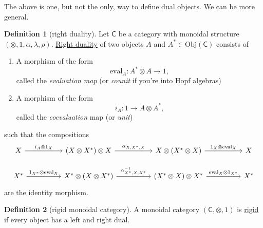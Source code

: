 \documentclass[a4paper]{report}
\newcommand{\defn}[1]{\ul{#1}}
\newcommand{\Obj}{\mathrm{Obj}}
\newcommand{\ev}{\mathrm{eval}}
\theoremstyle{definition}
\newtheorem{definition}{Definition}[section]
\theoremstyle{plain}
\theoremstyle{remark}
\begin{document}
The above is one, but not the only, way to define dual objects. We can be more general.
\begin{definition}[right duality]
  \label{def:rightduality}
  Let $\mathsf{C}$ be a category with monoidal structure $(\otimes, 1, \alpha, \lambda, \rho)$. \defn{Right duality} of two objects $A$ and $A^{*} \in \Obj(\mathsf{C})$ consists of
  \begin{enumerate}
    \item A morphism of the form
      \begin{equation*}
        \ev_{A}\colon A^{*} \otimes A \to 1,
      \end{equation*}
      called the \emph{evaluation map} (or \emph{counit} if you're into Hopf algebras)

    \item A morphism of the form
      \begin{equation*}
        i_{A}\colon 1 \to A \otimes A^{*},
      \end{equation*}
      called the \emph{coevaluation} map (or \emph{unit})
  \end{enumerate}
  such that the compositions
  \begin{equation*}
    \begin{tikzcd}[column sep=huge]
      X 
      \arrow[r, "i_{A} \otimes 1_{X}"]
      & (X \otimes X^{*}) \otimes X
      \arrow[r, "{\alpha_{X, X^{*}, X}}"]
      & X \otimes (X^{*} \otimes X) 
      \arrow[r, "{1_{X} \otimes \ev_{X}}"]
      & X
      \\
      X^{*}
      \arrow[r, "{1_{X^{*}} \otimes \ev_{X}}"]
      & X^{*} \otimes (X \otimes X^{*})
      \arrow[r, "{\alpha^{-1}_{X^{*}, X, X^{*}}}"]
      & (X^{*} \otimes X) \otimes X^{*}
      \arrow[r, "{\ev_{X}\otimes 1_{X^{*}}}"]
      & X^{*}
    \end{tikzcd}
  \end{equation*}
  are the identity morphism.
\end{definition}

\begin{definition}[rigid monoidal category]
  \label{def:rigidmonoidalcategory}
  A monoidal category $(\mathsf{C}, \otimes, 1)$ is \defn{rigid} if every object has a left and right dual.
\end{definition}
\end{document}
